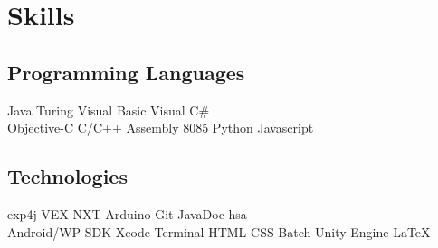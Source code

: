 \documentclass[]{deedy-resume-openfont}
\begin{document}
\begin{minipage}[t]{0.33\textwidth}




\section{Skills}
\subsection{Programming Languages}
Java \textbullet{}  Turing \textbullet{} Visual Basic \textbullet{}
Visual C\# \\ 
\vspace{1mm}
Objective-C \textbullet{} C/C++ \textbullet{} Assembly 8085 \textbullet{} Python \textbullet{} Javascript
\sectionsep

\subsection{Technologies}
exp4j \textbullet{}  VEX \textbullet{} NXT \textbullet{} Arduino \textbullet{} Git 
\textbullet{} JavaDoc \textbullet{} hsa
\\ 
\vspace{1mm}
Android/WP SDK \textbullet{} Xcode \textbullet{} Terminal \textbullet{} HTML \textbullet{} CSS \textbullet{} Batch \textbullet{} Unity Engine
\textbullet{} \LaTeX
\sectionsep


\end{minipage}
\end{document}
